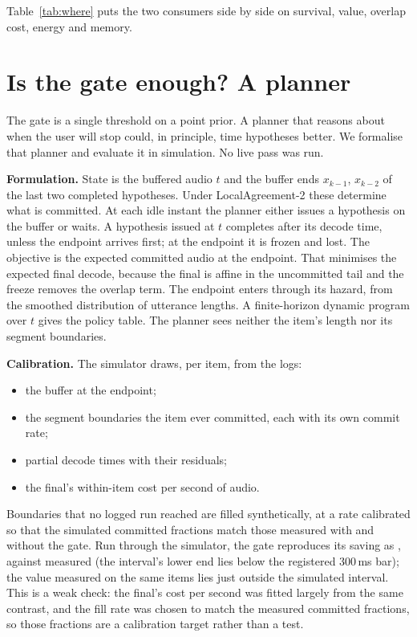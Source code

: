 Table~\ref{tab:where} puts the two consumers side by side on survival, value,
overlap cost, energy and memory.

\section{Is the gate enough? A planner}
\label{sec:planner}

The gate is a single threshold on a point prior. A planner that reasons about
when the user will stop could, in principle, time hypotheses better. We
formalise that planner and evaluate it in simulation. No live pass was run.

\textbf{Formulation.} State is the buffered audio $t$ and the buffer ends
$x_{k-1}$, $x_{k-2}$ of the last two completed hypotheses. Under
LocalAgreement-2 these determine what is committed. At each idle instant the
planner either issues a hypothesis on the buffer or waits. A hypothesis issued
at $t$ completes after its decode time, unless the endpoint arrives first; at
the endpoint it is frozen and lost. The objective is the expected committed
audio at the endpoint. That minimises the expected final decode, because the
final is affine in the uncommitted tail and the freeze removes the overlap
term. The endpoint enters through its hazard, from the smoothed distribution
of utterance lengths. A finite-horizon dynamic program over $t$ gives the
policy table. The planner sees neither the item's length nor its segment
boundaries.

\textbf{Calibration.} The simulator draws, per item, from the logs:
\begin{itemize}
\item the buffer at the endpoint;
\item the segment boundaries the item ever committed, each with its own commit
  rate;
\item partial decode times with their residuals;
\item the final's within-item cost per second of audio.
\end{itemize}
Boundaries that no logged run reached are filled synthetically, at a rate
calibrated so that the simulated committed fractions match those measured with
and without the gate. Run through the simulator, the gate reproduces its
saving as \PlannerVal, against \PthreeRed{} measured (the interval's lower end lies below the registered 300\,ms bar); the value
measured on
the same items lies just outside the simulated interval. This is a weak
check: the final's cost per second was fitted largely from the same contrast,
and the fill rate was chosen to match the measured committed fractions, so
those fractions are a calibration target rather than a test.

